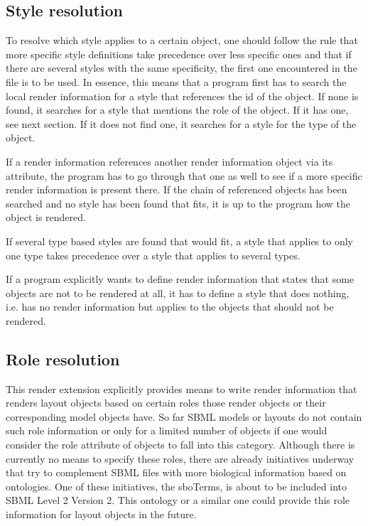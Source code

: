 \subsection{Style resolution}
\label{style-res}

To resolve which style applies to a certain object, one 
should follow the rule that more specific style definitions take precedence 
over less specific ones and that if there are several styles with the same 
specificity, the first one encountered in the file is to be used. In essence,
this means that a program first has to search the local render information for 
a style that references the id of the object. If none is found, it searches for 
a style that mentions the role of the object. If it has one, see next section. 
If it does not find one, it searches for a style for the type of the object. 

If a render information references another render information object via its 
 attribute, the program has to go through 
that one as well to see if a more specific render information is present there. 
If the chain of referenced \RenderInformation objects has been searched and no 
style has been found that fits, it is up to the program how the object is 
rendered. 

If several type based styles are found 
that would fit, a style that applies to only one type takes precedence over a 
style that applies to several types.

If a program explicitly wants to define render information that 
states that some objects are not to be rendered at all, it has to define a 
style that does nothing, i.e. has no render information but applies to the 
objects that should not be rendered. 


\subsection{Role resolution}
\label{role-res}

This render extension explicitly provides means to write render information
that renders layout objects based on certain roles those render objects or their
corresponding model objects have. So far SBML models or layouts do not contain
such role information or only for a limited number of objects if one would
consider the role attribute of  objects to fall into this category.
Although there is currently no means to specify these roles, there are already
initiatives underway that try to complement SBML files with more biological
information based on ontologies. One of these initiatives, the sboTerms, is
about to be included into SBML Level 2 Version 2. This ontology or a similar
one could provide this role information for layout objects in the future.   

